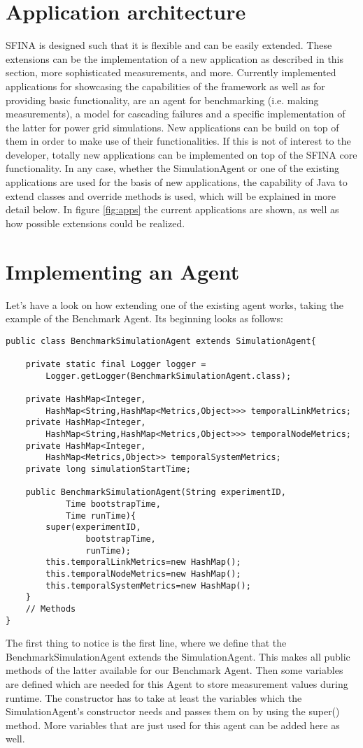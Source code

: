 \documentclass[11pt,fleqn]{book} %
\begin{document}
\section{Application architecture}\label{sec:apps}
SFINA is designed such that it is flexible and can be easily extended. These extensions can be the implementation of a new application as described in this section, more sophisticated measurements, and more. Currently implemented applications for showcasing the capabilities of the framework as well as for providing basic functionality, are an agent for benchmarking (i.e. making measurements), a model for cascading failures and a specific implementation of the latter for power grid simulations. New applications can be build on top of them in order to make use of their functionalities. If this is not of interest to the developer, totally new applications can be implemented on top of the SFINA core functionality. In any case, whether the SimulationAgent or one of the existing applications are used for the basis of new applications, the capability of Java to extend classes and override methods is used, which will be explained in more detail below. In figure \ref{fig:apps} the current applications are shown, as well as how possible extensions could be realized.

\section{Implementing an Agent}
Let’s have a look on how extending one of the existing agent works, taking the example of the Benchmark Agent. Its beginning looks as follows:
\begin{lstlisting}[frame=single]
public class BenchmarkSimulationAgent extends SimulationAgent{
    
    private static final Logger logger = 
    	Logger.getLogger(BenchmarkSimulationAgent.class);
    
    private HashMap<Integer,
    	HashMap<String,HashMap<Metrics,Object>>> temporalLinkMetrics;
    private HashMap<Integer,
    	HashMap<String,HashMap<Metrics,Object>>> temporalNodeMetrics;
    private HashMap<Integer,
    	HashMap<Metrics,Object>> temporalSystemMetrics;
    private long simulationStartTime;
    
    public BenchmarkSimulationAgent(String experimentID, 
            Time bootstrapTime, 
            Time runTime){
        super(experimentID,
                bootstrapTime,
                runTime);
        this.temporalLinkMetrics=new HashMap();
        this.temporalNodeMetrics=new HashMap();
        this.temporalSystemMetrics=new HashMap();
    }
    // Methods
}
\end{lstlisting}
The first thing to notice is the first line, where we define that the BenchmarkSimulationAgent extends the SimulationAgent. This makes all public methods of the latter available for our Benchmark Agent. Then some variables are defined which are needed for this Agent to store measurement values during runtime. The constructor has to take at least the variables which the SimulationAgent’s constructor needs and passes them on by using the super() method. More variables that are just used for this agent can be added here as well.
\end{document}
